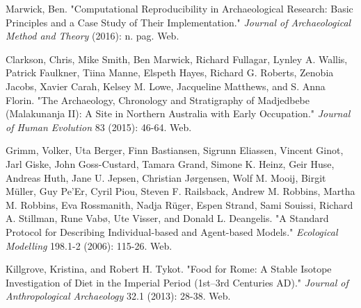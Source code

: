 \documentclass[12pt]{article}
\begin{document}
\newpage
\begin{thebibliography}{9}
        Marwick, Ben.
        "Computational Reproducibility in Archaeological Research: Basic Principles and a Case Study of Their Implementation."
        \textit{Journal of Archaeological Method and Theory}
        (2016): n. pag. Web.

        Clarkson, Chris,
        Mike Smith,
        Ben Marwick,
        Richard Fullagar,
        Lynley A. Wallis,
        Patrick Faulkner,
        Tiina Manne,
        Elspeth Hayes,
        Richard G. Roberts,
        Zenobia Jacobs,
        Xavier Carah,
        Kelsey M. Lowe,
        Jacqueline Matthews,
        and S. Anna Florin.
        "The Archaeology, Chronology and Stratigraphy of Madjedbebe (Malakunanja II): A Site in Northern Australia with Early Occupation."
        \textit{Journal of Human Evolution}
        83 (2015): 46-64. Web.

        Grimm, Volker,
        Uta Berger,
        Finn Bastiansen,
        Sigrunn Eliassen,
        Vincent Ginot,
        Jarl Giske,
        John Goss-Custard,
        Tamara Grand,
        Simone K. Heinz,
        Geir Huse,
        Andreas Huth,
        Jane U. Jepsen,
        Christian Jørgensen,
        Wolf M. Mooij,
        Birgit Müller,
        Guy Pe’Er,
        Cyril Piou,
        Steven F. Railsback,
        Andrew M. Robbins,
        Martha M. Robbins,
        Eva Rossmanith,
        Nadja Rüger,
        Espen Strand,
        Sami Souissi,
        Richard A. Stillman,
        Rune Vabø,
        Ute Visser,
        and Donald L. Deangelis.
        "A Standard Protocol for Describing Individual-based and Agent-based Models."
        \textit{Ecological Modelling}
        198.1-2 (2006): 115-26. Web.

        Killgrove, Kristina,
        and Robert H. Tykot.
        "Food for Rome: A Stable Isotope Investigation of Diet in the Imperial Period (1st–3rd Centuries AD)."
        \textit{Journal of Anthropological Archaeology}
        32.1 (2013): 28-38. Web.

\end{thebibliography}
\end{document}
